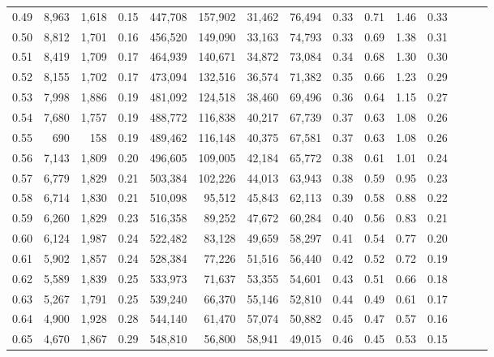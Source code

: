 \begin{tabular}{rrrrrrrrrrrrrrr}
0.49 &   8,963 &  1,618 &  0.15 &  447,708 &  157,902 &   31,462 &   76,494 &  0.33 &  0.71 &  1.46 &      0.33 \\
0.50 &   8,812 &  1,701 &  0.16 &  456,520 &  149,090 &   33,163 &   74,793 &  0.33 &  0.69 &  1.38 &      0.31 \\
0.51 &   8,419 &  1,709 &  0.17 &  464,939 &  140,671 &   34,872 &   73,084 &  0.34 &  0.68 &  1.30 &      0.30 \\
0.52 &   8,155 &  1,702 &  0.17 &  473,094 &  132,516 &   36,574 &   71,382 &  0.35 &  0.66 &  1.23 &      0.29 \\
0.53 &   7,998 &  1,886 &  0.19 &  481,092 &  124,518 &   38,460 &   69,496 &  0.36 &  0.64 &  1.15 &      0.27 \\
0.54 &   7,680 &  1,757 &  0.19 &  488,772 &  116,838 &   40,217 &   67,739 &  0.37 &  0.63 &  1.08 &      0.26 \\
0.55 &     690 &    158 &  0.19 &  489,462 &  116,148 &   40,375 &   67,581 &  0.37 &  0.63 &  1.08 &      0.26 \\
0.56 &   7,143 &  1,809 &  0.20 &  496,605 &  109,005 &   42,184 &   65,772 &  0.38 &  0.61 &  1.01 &      0.24 \\
0.57 &   6,779 &  1,829 &  0.21 &  503,384 &  102,226 &   44,013 &   63,943 &  0.38 &  0.59 &  0.95 &      0.23 \\
0.58 &   6,714 &  1,830 &  0.21 &  510,098 &   95,512 &   45,843 &   62,113 &  0.39 &  0.58 &  0.88 &      0.22 \\
0.59 &   6,260 &  1,829 &  0.23 &  516,358 &   89,252 &   47,672 &   60,284 &  0.40 &  0.56 &  0.83 &      0.21 \\
0.60 &   6,124 &  1,987 &  0.24 &  522,482 &   83,128 &   49,659 &   58,297 &  0.41 &  0.54 &  0.77 &      0.20 \\
0.61 &   5,902 &  1,857 &  0.24 &  528,384 &   77,226 &   51,516 &   56,440 &  0.42 &  0.52 &  0.72 &      0.19 \\
0.62 &   5,589 &  1,839 &  0.25 &  533,973 &   71,637 &   53,355 &   54,601 &  0.43 &  0.51 &  0.66 &      0.18 \\
0.63 &   5,267 &  1,791 &  0.25 &  539,240 &   66,370 &   55,146 &   52,810 &  0.44 &  0.49 &  0.61 &      0.17 \\
0.64 &   4,900 &  1,928 &  0.28 &  544,140 &   61,470 &   57,074 &   50,882 &  0.45 &  0.47 &  0.57 &      0.16 \\
0.65 &   4,670 &  1,867 &  0.29 &  548,810 &   56,800 &   58,941 &   49,015 &  0.46 &  0.45 &  0.53 &      0.15 \\

\end{tabular}
